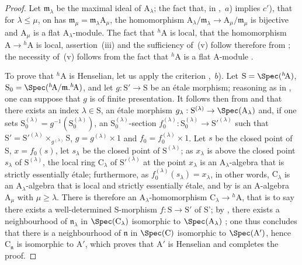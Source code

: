 \begin{proof}
Let $\mathfrak{m}_\lambda$ be the maximal ideal of $\mathrm{A}_\lambda$;
the fact that, in ,~$a$) implies $c'$), that for $\lambda\leq\mu$, on has $\mathfrak{m}_\mu=\mathfrak{m}_\lambda\mathrm{A}_\mu$, the homomorphism $\mathrm{A}_\lambda/\mathfrak{m}_\lambda\to\mathrm{A}_\mu/\mathfrak{m}_\mu$ is bijective and $\mathrm{A}_\mu$ is a flat $\mathrm{A}_\lambda$-module.
The fact that ${}^h\!\mathrm{A}$ is local, that the homomorphism $\mathrm{A}\to{}^h\!\mathrm{A}$ is local, assertion~(iii) and the sufficiency of~(v) follow therefore from ;
the necessity of~(v) follows from the fact that ${}^h\!\mathrm{A}$ is a flat A-module .

To prove that ${}^h\!\mathrm{A}$ is Henselian, let us apply the criterion ,~$b$).
Let $\mathrm{S}=\Spec({}^h\!\mathrm{A})$, $\mathrm{S}_0=\Spec({}^h\!\mathrm{A}/\mathfrak{m}.{}^h\!\mathrm{A})$, and let $g:\mathrm{S}'\to\mathrm{S}$ be an \'{e}tale morphism;
reasoning as in , one can suppose that $g$ is of finite presentation.
It follows then from  and  that there exists an index $\lambda\in\mathrm{S}$, an \'{e}tale morphism $g_\lambda:\mathrm{S}^{(\lambda)}\to\Spec(\mathrm{A}_\lambda)$ and, if one sets $\mathrm{S}_0^{(\lambda)}=g^{-1}(\mathrm{S}_0^{(\lambda)})$, an $\mathrm{S}_0^{(\lambda)}$-section $f_0^{(\lambda)}:\mathrm{S}_0^{(\lambda)}\to\mathrm{S}'^{(\lambda)}$ such that $\mathrm{S}'=\mathrm{S}'^{(\lambda)}\times_{g^{(\lambda)}}\mathrm{S}$, $g=g^{(\lambda)}\times 1$ and $f_0=f_0^{(\lambda)}\times 1$.
Let $s$ be the closed point of S, $x=f_0(s)$, let $s_\lambda$ be the closed point of $\mathrm{S}^{(\lambda)}$;
as $x_\lambda$ is above the closed point $s_\lambda$ of $\mathrm{S}^{(\lambda)}$, the local ring $\mathrm{C}_\lambda$ of $\mathrm{S}'^{(\lambda)}$ at the point $x_\lambda$ is an $\mathrm{A}_\lambda$-algebra that is strictly essentially \'{e}tale;
furthermore, as $f_0^{(\lambda)}(s_\lambda)=x_\lambda$, in other words, $\mathrm{C}_\lambda$ is an $\mathrm{A}_\lambda$-algebra that is local and strictly essentially \'{e}tale, and by  is an A-algebra $\mathrm{A}_\mu$ with $\mu\geq\lambda$.
There is therefore an $\mathrm{A}_\lambda$-homomorphism $\mathrm{C}_\lambda\to{}^h\!\mathrm{A}$, that is to say there exists a well-determined S-morphism $f:\mathrm{S}\to\mathrm{S}'$ of S';
by , there exists a neighbourhood of $\mathfrak{n}_\lambda$ in $\Spec(\mathrm{C}_\lambda)$ isomorphic to $\Spec(\mathrm{A}_\lambda)$ ;
one thus concludes that there is a neighbourhood of $\mathfrak{n}$ in $\Spec(\mathrm{C})$ isomorphic to $\Spec(\mathrm{A}')$, hence $\mathrm{C}_\mathfrak{n}$ is isomorphic to $\mathrm{A}'$, which proves that $\mathrm{A}'$ is Henselian  and completes the proof.


\end{proof}
